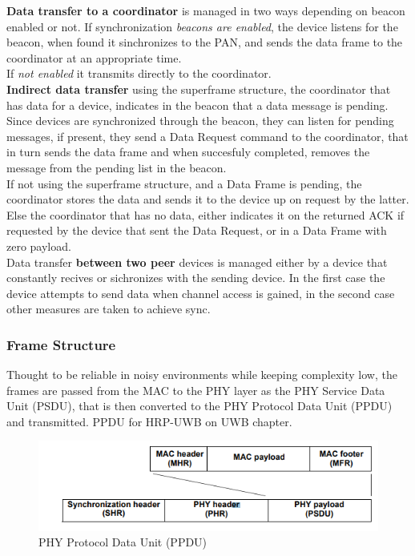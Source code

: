 \documentclass[conference]{IEEEtran}
\begin{document}
\textbf{Data transfer to a coordinator} is managed in two ways depending on beacon enabled 
or not. If synchronization \emph{beacons are enabled}, the device listens for the beacon, when found 
it sinchronizes to the PAN, and sends the data frame to the coordinator at an appropriate 
time.\\
If \emph{not enabled} it transmits directly to the coordinator.\\

\textbf{Indirect data transfer} using the superframe structure, the coordinator that has data for
a device, indicates in the beacon that a data message is pending. Since devices are
synchronized through the beacon, they can listen for pending messages, if present, they
send a Data Request command to the coordinator, that in turn sends the data frame and when
succesfuly completed, removes the message from the pending list in the beacon.\\
If not using the superframe structure, and a Data Frame is pending, the coordinator stores 
the data and sends it to the device up on request by the latter. Else the coordinator that 
has no data, either indicates it on the returned ACK if requested by the device that sent the
Data Request, or in a Data Frame with zero payload.\\ 

Data transfer \textbf{between two peer} devices is managed either by a device that constantly 
recives or sichronizes with the sending device. In the first case the device attempts to 
send data when channel access is gained, in the second case other measures are taken to 
achieve sync.\\

\subsubsection{Frame Structure}
Thought to be reliable in noisy environments while keeping complexity low, the frames are
passed from the MAC to the PHY layer as the PHY Service Data Unit (PSDU), that is then
converted to the PHY Protocol Data Unit (PPDU) and transmitted. PPDU for HRP-UWB 
on UWB chapter.\\

\begin{figure}[!h]
  \centering
  \includegraphics[width=1\linewidth]{PPDU}
  \caption{PHY Protocol Data Unit (PPDU)}
  \label{fig:PPDU}
\end{figure}
\end{document}
